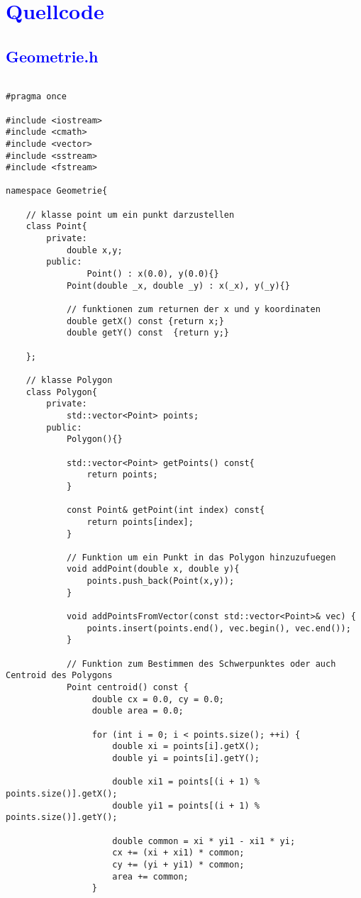 \documentclass{article}
\begin{document}
\section{\textcolor{blue}{Quellcode}}
\subsection{\textcolor{blue}{Geometrie.h}}
\begin{verbatim}

#pragma once

#include <iostream>
#include <cmath>
#include <vector>
#include <sstream>
#include <fstream>

namespace Geometrie{

	// klasse point um ein punkt darzustellen
	class Point{
		private:
			double x,y;
		public:
		        Point() : x(0.0), y(0.0){}
			Point(double _x, double _y) : x(_x), y(_y){}

			// funktionen zum returnen der x und y koordinaten
			double getX() const {return x;}
			double getY() const  {return y;}

	};

	// klasse Polygon
	class Polygon{
		private:
			std::vector<Point> points;
		public:
			Polygon(){}

			std::vector<Point> getPoints() const{
				return points;
			}

			const Point& getPoint(int index) const{
				return points[index];
			}

			// Funktion um ein Punkt in das Polygon hinzuzufuegen
			void addPoint(double x, double y){
				points.push_back(Point(x,y));
			}

			void addPointsFromVector(const std::vector<Point>& vec) {
				points.insert(points.end(), vec.begin(), vec.end());
			}

			// Funktion zum Bestimmen des Schwerpunktes oder auch Centroid des Polygons
			Point centroid() const {
		         double cx = 0.0, cy = 0.0;
		         double area = 0.0;

		         for (int i = 0; i < points.size(); ++i) {
		             double xi = points[i].getX();
		             double yi = points[i].getY();

		             double xi1 = points[(i + 1) % points.size()].getX();
		             double yi1 = points[(i + 1) % points.size()].getY();

		             double common = xi * yi1 - xi1 * yi;
		             cx += (xi + xi1) * common;
		             cy += (yi + yi1) * common;
		             area += common;
		         }


\end{verbatim}
\end{document}
